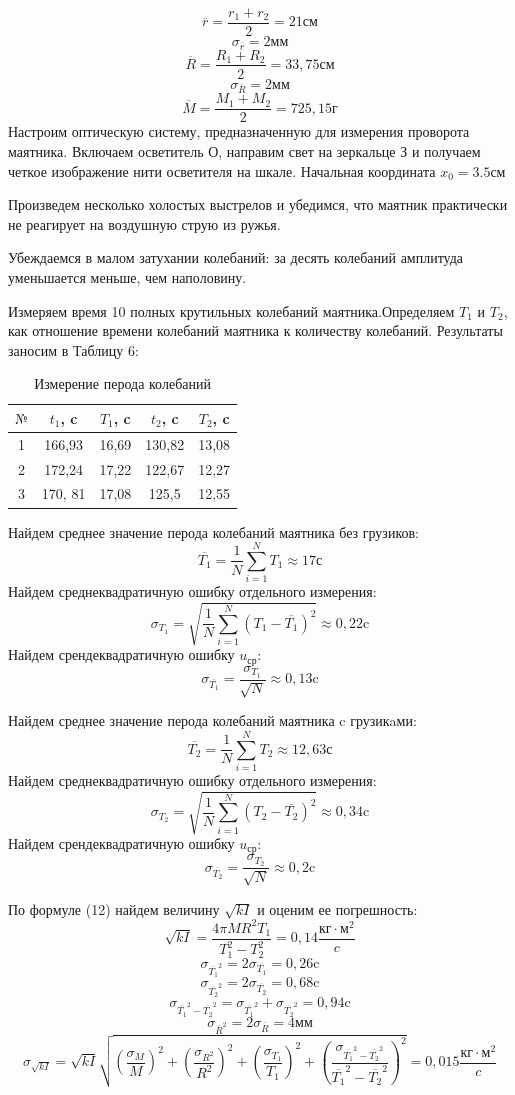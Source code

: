 \documentclass[a4paper,12pt]{article} %
\begin{document}
\[\overline{r}= \frac{r_1+r_2}{2} = 21\text{см}\]
\[\sigma_{\overline{r}} = 2\text{мм}\]
\[\overline{R}= \frac{R_1+R_2}{2} = 33,75\text{см}\]
\[\sigma_{\overline{R}} = 2\text{мм}\]
\[\overline{M}= \frac{M_1+M_2}{2} = 725,15\text{г}\]
Настроим оптическую систему, предназначенную для измерения проворота маятника. Включаем осветитель О, направим свет на зеркальце З и получаем четкое изображение нити осветителя на шкале. Начальная координата $x_0 = 3.5\text{см}$

Произведем несколько холостых выстрелов и убедимся, что маятник практически не реагирует на воздушную струю из ружья.

Убеждаемся в малом затухании колебаний: за десять колебаний амплитуда уменьшается меньше, чем наполовину.

Измеряем время 10 полных крутильных колебаний маятника.Определяем $T_1$ и $T_2$, как отношение времени колебаний маятника к количеству колебаний. Результаты заносим в Таблицу 6:
\begin{table}[h]
\centering
\caption{Измерение перода колебаний}
\begin{tabular}{|c|c|c|c|c|}
\hline
$\text{№}$ & $t_1$, c & $T_1$, c & $t_2$, c & $T_2$, c\\ \hline
1 & 166,93 & 16,69 & 130,82 & 13,08\\ \hline
2 & 172,24 & 17,22 & 122,67 & 12,27\\ \hline
3& 170, 81 & 17,08 & 125,5 & 12,55\\ \hline
\end{tabular}
\end{table}
Найдем среднее значение перода колебаний маятника без грузиков:
\[\overline{T_1} = \frac{1}{N}\sum_{i=1}^{N}T_1 \approx 17\text{с}\]
Найдем среднеквадратичную ошибку отдельного измерения:
\[\sigma_{T_1} = \sqrt{\frac{1}{N}\sum_{i=1}^N(T_1-\overline{T_1})^2} \approx 0,22\text{c}\]
Найдем срендеквадратичную ошибку ${u_\text{ср}}$:
\[\sigma_{\overline{T_1}} = \frac{\sigma_{T_1}}{\sqrt{N}}\approx 0,13\text{c}\]

Найдем среднее значение перода колебаний маятника c грузикaми:
\[\overline{T_2} = \frac{1}{N}\sum_{i=1}^{N}T_2 \approx 12,63\text{с}\]
Найдем среднеквадратичную ошибку отдельного измерения:
\[\sigma_{T_2} = \sqrt{\frac{1}{N}\sum_{i=1}^N(T_2-\overline{T_2})^2} \approx 0,34\text{c}\]
Найдем срендеквадратичную ошибку ${u_\text{ср}}$:
\[\sigma_{\overline{T_2}} = \frac{\sigma_{T_2}}{\sqrt{N}}\approx 0,2\text{c}\]


По формуле (12) найдем величину $\sqrt{kI}$ и оценим ее погрешность:
\[\sqrt{kI}=\frac{4\pi MR^2T_1}{T_1^2-T_2^2} = 0,14\frac{\text{кг}\cdot \text{м}^2}{c}\]
\[\sigma_{\overline{T_1}^2} = 2\sigma_{\overline{T_1}} = 0,26\text{c}\]
\[\sigma_{\overline{T_2}^2} = 2\sigma_{\overline{T_2}} = 0,68\text{c}\]
\[\sigma_{\overline{T_1}^2-\overline{T_2}^2}  = \sigma_{\overline{T_1}^2}+\sigma_{\overline{T_2}^2}=0,94\text{c}\]
\[\sigma_{\overline{R}^2} = 2\sigma_{\overline{R}} = 4\text{мм}\]
\[\sigma_{\sqrt{kI}} = \sqrt{kI} \sqrt{\left(\frac{\sigma_M}{M}\right)^2+\left(\frac{\sigma_{R^2}}{R^2}\right)^2 + \left(\frac{\sigma_{T_1}}{T_1}\right)^2 + \left(\frac{\sigma_{\overline{T_1}^2-\overline{T_2}^2}}{\overline{T_1}^2-\overline{T_2}^2}\right)^2} = 0,015\frac{\text{кг}\cdot \text{м}^2}{c} \]
\end{document}
